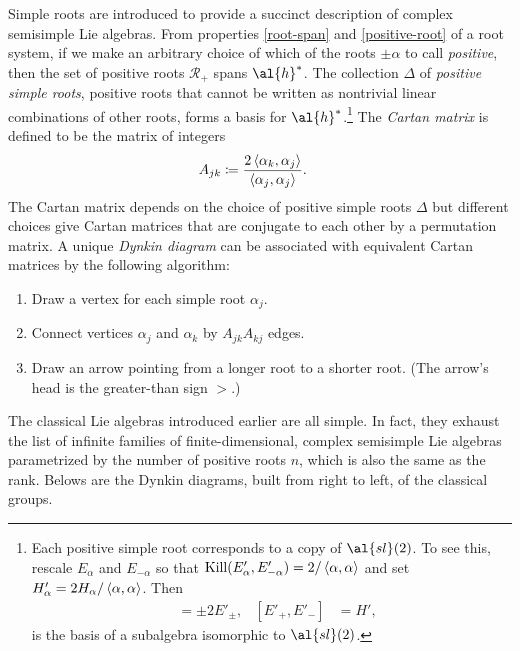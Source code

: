 Simple roots are introduced to provide a succinct description of complex semisimple Lie algebras. From properties \ref{root-span} and \ref{positive-root} of a root system, if we make an arbitrary choice of which of the roots $\pm \alpha$ to call \emph{positive}, then the set of positive roots $\mathcal{R}_+$ spans $\al{h}^*$. The collection $\Delta$ of \emph{positive simple roots}, positive roots that cannot be written as nontrivial linear combinations of other roots, forms a basis for $\al{h}^*$.\footnote{Each positive simple root corresponds to a copy of $\al{sl}(2)$. To see this, rescale $E_{\alpha}$ and $E_{-\alpha}$ so that $\text{Kill}(E'_{\alpha},E'_{-\alpha}) = 2/\braket{\alpha,\alpha}$ and set $H'_{\alpha} = 2H_{\alpha}/\braket{\alpha,\alpha}$. Then
	\begin{align}
	[H',E'_{\pm}] &= \pm 2E'_{\pm},&
	[E'_+,E'_-] &= H',
	\end{align}
	is the basis of a subalgebra isomorphic to $\al{sl}(2)$.}  The \emph{Cartan matrix} is defined to be the matrix of integers
\begin{align}
A_{jk} &\coloneqq \frac{2\braket{\alpha_k,\alpha_j}}{\braket{\alpha_j,\alpha_j}}.
\end{align}
The Cartan matrix depends on the choice of positive simple roots $\Delta$ but different choices give Cartan matrices that are conjugate to each other by a permutation matrix. A unique \emph{Dynkin diagram} can be associated with equivalent Cartan matrices by the following algorithm:
\begin{enumerate}
	\item Draw a vertex for each simple root $\alpha_j$.
	\item Connect vertices $\alpha_j$ and $\alpha_k$ by $A_{jk}A_{kj}$ edges.
	\item Draw an arrow pointing from a longer root to a shorter root. (The arrow's head is the greater-than sign $>$.)
\end{enumerate}
The classical Lie algebras introduced earlier are all simple. In fact, they exhaust the list of infinite families of finite-dimensional, complex semisimple Lie algebras parametrized by the number of positive roots $n$, which is also the same as the rank. Belows are the Dynkin diagrams, built from right to left, of the classical groups.
